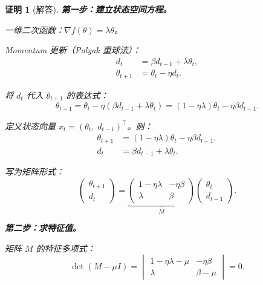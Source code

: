 \documentclass[12pt,a4paper]{ctexart}
\theoremstyle{definition}
\theoremstyle{plain}
\newtheorem*{proof*}{证明}
\newcommand{\grad}{\nabla}
\begin{document}
\begin{proof*}[解答]

\noindent\textbf{第一步：建立状态空间方程。}

一维二次函数：$\grad f(\theta) = \lambda\theta$。

Momentum 更新（Polyak 重球法）：
\begin{equation}\label{s5:momentum}
  \begin{aligned}
    d_t &= \beta d_{t-1} + \lambda\theta_t, \\
    \theta_{t+1} &= \theta_t - \eta d_t.
  \end{aligned}
\end{equation}

将 $d_t$ 代入 $\theta_{t+1}$ 的表达式：
\begin{equation}
  \theta_{t+1} = \theta_t - \eta(\beta d_{t-1} + \lambda\theta_t) = (1 - \eta\lambda)\theta_t - \eta\beta d_{t-1}.
\end{equation}

定义状态向量 $x_t = (\theta_t,\; d_{t-1})^\top$。则：
\begin{equation}
  \begin{aligned}
    \theta_{t+1} &= (1 - \eta\lambda)\theta_t - \eta\beta d_{t-1}, \\
    d_t &= \beta d_{t-1} + \lambda\theta_t.
  \end{aligned}
\end{equation}

写为矩阵形式：
\begin{equation}
  \boxed{
  \begin{pmatrix} \theta_{t+1} \\ d_t \end{pmatrix}
  = \underbrace{\begin{pmatrix} 1 - \eta\lambda & -\eta\beta \\ \lambda & \beta \end{pmatrix}}_{M}
  \begin{pmatrix} \theta_t \\ d_{t-1} \end{pmatrix}.
  }
\end{equation}

\noindent\textbf{第二步：求特征值。}

矩阵 $M$ 的特征多项式：
\begin{equation}
  \det(M - \mu I) =
  \begin{vmatrix}
    1 - \eta\lambda - \mu & -\eta\beta \\
    \lambda & \beta - \mu
  \end{vmatrix} = 0.
\end{equation}


\end{proof*}
\end{document}
